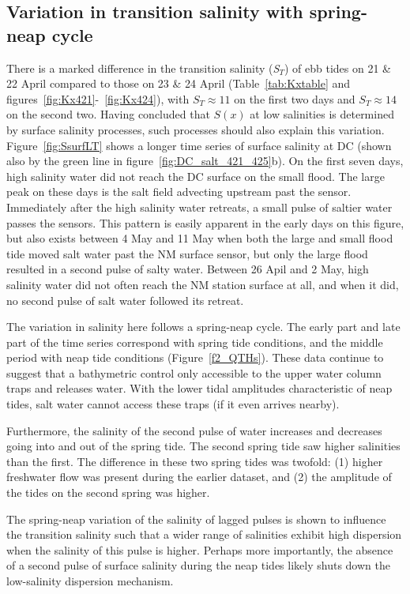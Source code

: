 \subsection{Variation in transition salinity with spring-neap cycle}
There is a marked difference in the transition salinity (\emph{S$_T$}) of ebb tides on 21 \& 22 April compared to those on 23 \& 24 April (Table~\ref{tab:Kxtable} and figures~\ref{fig:Kx421}-~\ref{fig:Kx424}), with $S_T\approx 11$ on the first two days and $S_T\approx 14$ on the second two. Having concluded that $S(x)$ at low salinities is determined by surface salinity processes, such processes should also explain this variation. Figure~\ref{fig:SsurfLT} shows a longer time series of surface salinity at DC (shown also by the green line in figure~\ref{fig:DC_salt_421_425}b). On the first seven days, high salinity water did not reach the DC surface on the small flood. The large peak on these days is the salt field advecting upstream past the sensor. Immediately after the high salinity water retreats, a small pulse of saltier water passes the sensors. This pattern is easily apparent in the early days on this figure, but also exists between 4 May and 11 May when both the large and small flood tide moved salt water past the NM surface sensor, but only the large flood resulted in a second pulse of salty water. Between 26 Apil and 2 May, high salinity water did not often reach the NM station surface at all, and when it did, no second pulse of salt water followed its retreat. 

The variation in salinity here follows a spring-neap cycle. The early part and late part of the time series correspond with spring tide conditions, and the middle period with neap tide conditions (Figure~\ref{f2_QTHs}). These data continue to suggest that a bathymetric control only accessible to the upper water column traps and releases water. With the lower tidal amplitudes characteristic of neap tides, salt water cannot access these traps (if it even arrives nearby).  

Furthermore, the salinity of the second pulse of water increases and decreases going into and out of the spring tide. The second spring tide saw higher salinities than the first. The difference in these two spring tides was twofold: (1) higher freshwater flow was present during the earlier dataset, and (2) the amplitude of the tides on the second spring was higher. 

The spring-neap variation of the salinity of lagged pulses is shown to influence the transition salinity such that a wider range of salinities exhibit high dispersion when the salinity of this pulse is higher. Perhaps more importantly, the absence of a second pulse of surface salinity during the neap tides likely shuts down the low-salinity dispersion mechanism.  

